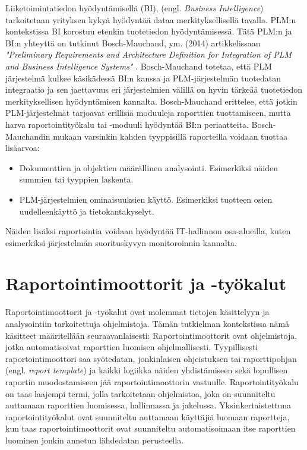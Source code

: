 Liiketoimintatiedon hyödyntämisellä (BI), (engl. \textit{Business Intelligence}) tarkoitetaan yrityksen kykyä hyödyntää dataa merkityksellisellä tavalla. PLM:n kontekstissa BI korostuu etenkin tuotetiedon hyödyntämisessä. Tätä PLM:n ja BI:n yhteyttä on tutkinut Bosch-Mauchand, ym. (2014) artikkelissaan \textit{"Preliminary Requirements and Architecture Definition for Integration of PLM and Business Intelligence Systems"}  \cite{bayro-corrochano_preliminary_2014}. Bosch-Mauchand totetaa, että PLM järjestelmä kulkee käsikädessä BI:n kanssa ja PLM-järjestelmän tuotedatan integraatio ja sen jaettavuus eri järjestelmien välillä on hyvin tärkeää tuotetiedon merkityksellisen hyödyntämisen kannalta.
Bosch-Mauchand erittelee, että jotkin PLM-järjestelmät tarjoavat erillisiä moduuleja raporttien tuottamiseen, mutta harva raportointityökalu tai -moduuli hyödyntää BI:n periaatteita. Bosch-Mauchandin mukaan varsinkin kahden tyyppisillä raporteilla voidaan tuottaa lisäarvoa:  \cite{bayro-corrochano_preliminary_2014}
\begin{itemize}
\item Dokumenttien ja objektien määrällinen analysointi. Esimerkiksi näiden summien tai tyyppien laskenta.
\item PLM-järjestelmien ominaisuuksien käyttö. Esimerkiksi tuotteen osien uudelleenkäyttö ja tietokantakyselyt.
\end{itemize}
Näiden lisäksi raportointia voidaan hyödyntää IT-hallinnon osa-alueilla, kuten esimerkiksi järjestelmän suorituskyvyn monitoroinnin kannalta.

\section{Raportointimoottorit ja -työkalut} \label{Raportointimoottorit ja -työkalut}

Raportointimoottorit ja -työkalut ovat molemmat tietojen käsittelyyn ja analysointiin tarkoitettuja ohjelmistoja. Tämän tutkielman kontekstissa nämä käsitteet määritellään seuraavanlaisesti: Raportointimoottorit ovat ohjelmistoja, jotka automatisoivat raporttien luomisen ohjelmallisesti. Tyypillisesti raportointimoottori saa syötedatan, jonkinlaisen ohjeistuksen tai raporttipohjan (engl. \textit{report template}) ja kaikki logiikka näiden yhdistämiseen sekä lopullisen raportin muodostamiseen jää raportointimoottorin vastuulle.  \cite{he_design_2010} Raportointityökalu on taas laajempi termi, jolla tarkoitetaan ohjelmistoa, joka on suunniteltu auttamaan raporttien luomisessa, hallinnassa ja jakelussa. Yksinkertaistettuna raportointityökalut ovat suunniteltu auttamaan käyttäjiä luomaan raportteja, kun taas raportointimoottorit ovat suunniteltu automatisoimaan itse raporttien luominen jonkin annetun lähdedatan perusteella.

